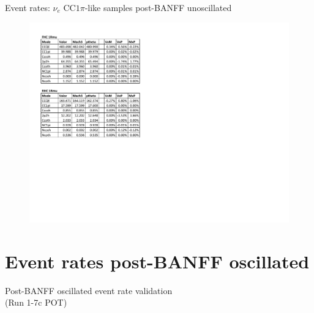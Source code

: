 \documentclass{beamer}
\begin{document}
\begin{frame}{Event rates: $\nu_e\text{ CC}1\pi$-like samples post-BANFF unoscillated}
	\centering
	\begin{figure}
		\includegraphics[page=3, trim={0cm 15cm 13cm 1cm}, clip, scale=0.52] {images/rates/postfit_unosc}
	\end{figure}
\end{frame}

\section{Event rates post-BANFF oscillated}
\begin{frame}
	\centering
	\Large Post-BANFF oscillated event rate validation\\(Run 1-7c POT)
\end{frame}
\end{document}
